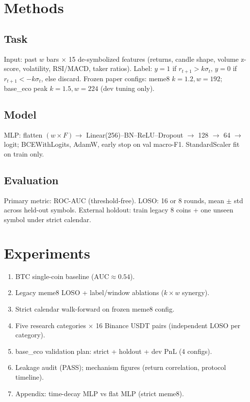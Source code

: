 \documentclass[11pt,a4paper]{article}
\begin{document}
\section{Methods}
\subsection{Task}
Input: past $w$ bars $\times$ 15 de-symbolized features (returns, candle shape, volume z-score,
volatility, RSI/MACD, taker ratios). Label: $y=1$ if $r_{t+1} > k\sigma_t$, $y=0$ if
$r_{t+1} < -k\sigma_t$, else discard. Frozen paper configs: meme8 $k{=}1.2, w{=}192$; base\_eco
peak $k{=}1.5, w{=}224$ (dev tuning only).

\subsection{Model}
MLP: flatten $(w \times F) \to$ Linear(256)--BN--ReLU--Dropout $\to$ 128 $\to$ 64 $\to$ logit;
BCEWithLogits, AdamW, early stop on val macro-F1. StandardScaler fit on train only.

\subsection{Evaluation}
Primary metric: ROC-AUC (threshold-free). LOSO: 16 or 8 rounds, mean $\pm$ std across held-out symbols.
External holdout: train legacy 8 coins + one unseen symbol under strict calendar.

\section{Experiments}
\begin{enumerate}
  \item BTC single-coin baseline ($\text{AUC} \approx 0.54$).
  \item Legacy meme8 LOSO + label/window ablations ($k \times w$ synergy).
  \item Strict calendar walk-forward on frozen meme8 config.
  \item Five research categories $\times$ 16 Binance USDT pairs (independent LOSO per category).
  \item base\_eco validation plan: strict + holdout + dev PnL (4 configs).
  \item Leakage audit (PASS); mechanism figures (return correlation, protocol timeline).
  \item Appendix: time-decay MLP vs flat MLP (strict meme8).
\end{enumerate}
\end{document}
